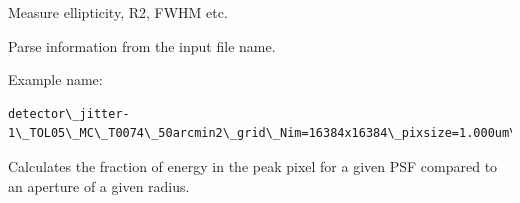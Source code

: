 \documentclass[a4paper,11pt,english]{sphinxmanual}
\begin{document}

\begin{fulllineitems}
\label{analysis:analysis.PSFproperties.measureChars}
Measure ellipticity, R2, FWHM etc.

\end{fulllineitems}


\begin{fulllineitems}
\label{analysis:analysis.PSFproperties.parseName}
Parse information from the input file name.

Example name:

\begin{Verbatim}[commandchars=\\\{\}]
detector\_jitter-1\_TOL05\_MC\_T0074\_50arcmin2\_grid\_Nim=16384x16384\_pixsize=1.000um\_lbda=800nm\_fieldX=-0.306\_fieldY=1.042.fits
\end{Verbatim}

\end{fulllineitems}


\begin{fulllineitems}
\label{analysis:analysis.PSFproperties.peakFraction}
Calculates the fraction of energy in the peak pixel for a given PSF compared
to an aperture of a given radius.

\end{fulllineitems}


\begin{fulllineitems}
\label{analysis:analysis.PSFproperties.plotEncircledEnergy}
\end{fulllineitems}

\end{document}
